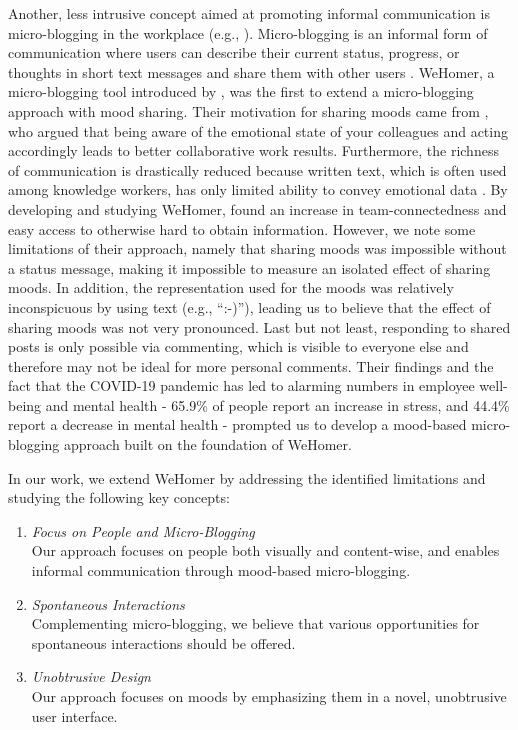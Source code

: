 Another, less intrusive concept aimed at promoting informal communication is micro-blogging in the workplace (e.g., \autocite{ebner2008microblogging, ehrlich2010microblogging, zhang2010case, dullemond2013fixing}). Micro-blogging is an informal form of communication where users can describe their current status, progress, or thoughts in short text messages and share them with other users \autocite{java2007we, dullemond2013fixing}. WeHomer, a micro-blogging tool introduced by \textcite{dullemond2013fixing}, was the first to extend a micro-blogging approach with mood sharing. Their motivation for sharing moods came from \textcite{garcia1999emotional}, who argued that being aware of the emotional state of your colleagues and acting accordingly leads to better collaborative work results.  Furthermore, the richness of communication is drastically reduced because written text, which is often used among knowledge workers, has only limited ability to convey emotional data \autocite{hook2008interactional}. By developing and studying WeHomer, \textcite{dullemond2013fixing} found an increase in team-connectedness and easy access to otherwise hard to obtain information. However, we note some limitations of their approach, namely that sharing moods was impossible without a status message, making it impossible to measure an isolated effect of sharing moods. In addition, the representation used for the moods was relatively inconspicuous by using text (e.g., \enquote{:-)}), leading us to believe that the effect of sharing moods was not very pronounced. Last but not least, responding to shared posts is only possible via commenting, which is visible to everyone else and therefore may not be ideal for more personal comments. Their findings and the fact that the COVID-19 pandemic has led to alarming numbers in employee well-being and mental health - 65.9\% of people report an increase in stress, and 44.4\% report a decrease in mental health \autocite{mswellbeing} - prompted us to develop a mood-based micro-blogging approach built on the foundation of WeHomer.

In our work, we extend WeHomer by addressing the identified limitations and studying the following key concepts:

\begin{enumerate}
    \item \textit{Focus on People and Micro-Blogging} \\
    Our approach focuses on people both visually and content-wise, and enables informal communication through mood-based micro-blogging.
    \item \textit{Spontaneous Interactions} \\
    Complementing micro-blogging, we believe that various opportunities for spontaneous interactions should be offered.
    \item \textit{Unobtrusive Design} \\ 
    Our approach focuses on moods by emphasizing them in a novel, unobtrusive user interface.
\end{enumerate}

